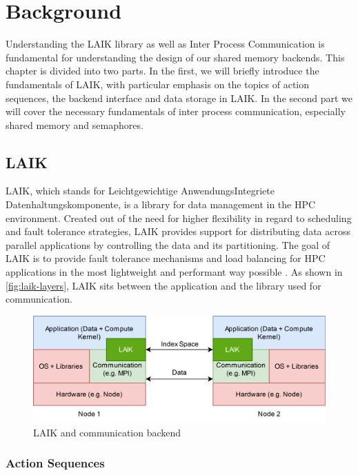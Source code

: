 
\chapter{Background}\label{chapter:background}

Understanding the LAIK library as well as Inter Process Communication is fundamental for understanding the design of our shared memory backends. 
This chapter is divided into two parts. 
In the first, we will briefly introduce the fundamentals of LAIK, with particular emphasis on the topics of action sequences, the backend interface and data storage in LAIK. 
In the second part we will cover the necessary fundamentals of inter process communication, especially shared memory and semaphores.

\section{LAIK}

LAIK, which stands for \glqq Leichtgewichtige AnwendungsIntegriete Datenhaltungskomponente\grqq, is a library for data management in the HPC environment. 
Created out of the need for higher flexibility in regard to scheduling and fault tolerance strategies, LAIK provides support for distributing data across parallel applications by controlling the data and its partitioning. 
The goal of LAIK is to provide fault tolerance mechanisms and load balancing for HPC applications in the most lightweight and performant way possible \cite{laik-paper}. 
As shown in \autoref{fig:laik-layers}, LAIK sits between the application and the library used for communication.

\begin{figure}[h]
	\centering
	\includegraphics[width=0.75\columnwidth]{figures/laik-layers.png}
	\caption{LAIK and communication backend\cite{laik-paper}}
	\label{fig:laik-layers}
\end{figure}

\subsection{Action Sequences}

